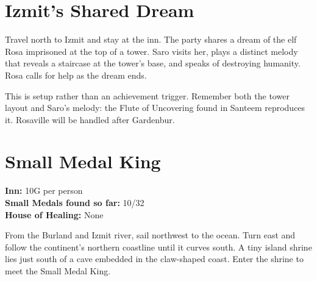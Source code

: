 \documentclass[
  american,
  10pt,
  letterpaper,
  oneside,
  open=any]{scrreprt}
\begin{document}
\section{Izmit's Shared Dream}\label{izmits-shared-dream}

Travel north to Izmit and stay at the inn. The party shares a dream of
the elf Rosa imprisoned at the top of a tower. Saro visits her, plays a
distinct melody that reveals a staircase at the tower's base, and speaks
of destroying humanity. Rosa calls for help as the dream ends.

This is setup rather than an achievement trigger. Remember both the
tower layout and Saro's melody: the Flute of Uncovering found in Santeem
reproduces it. Rosaville will be handled after Gardenbur.

\section{Small Medal King}\label{small-medal-king}

\textbf{Inn:} 10G per person\\
\textbf{Small Medals found so far:} 10/32\\
\textbf{House of Healing:} None

From the Burland and Izmit river, sail northwest to the ocean. Turn east
and follow the continent's northern coastline until it curves south. A
tiny island shrine lies just south of a cave embedded in the claw-shaped
coast. Enter the shrine to meet the Small Medal King.
\end{document}
